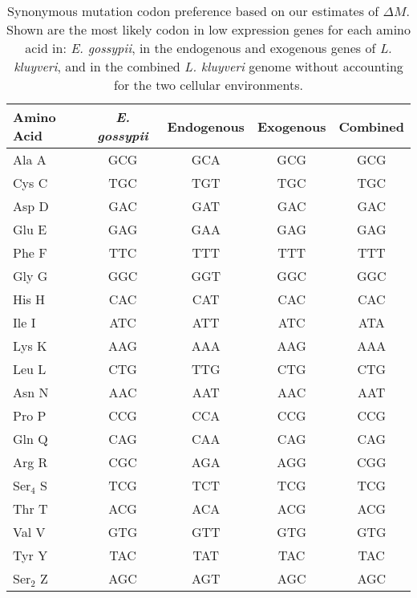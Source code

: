 \documentclass[doublespacing,linenumbers]{bmcart-modified}
\newcommand{\kluyveri}{\textit{L. kluyveri}\xspace}
\newcommand{\gossypii}{\textit{E. gossypii}\xspace}
\newcommand{\DM}{\ensuremath{{\Delta M}}\xspace}
\begin{document}
\begin{backmatter}
\begin{table}[h]
    \centering
    \caption{Synonymous mutation codon preference based on our estimates of $\DM$.
	 Shown are the most likely codon in low expression genes for each amino acid in: \gossypii, in the endogenous and exogenous genes of \kluyveri, and in the combined \kluyveri genome without accounting for the two cellular environments.}
\begin{tabular}{  l  c  c  c  c  }
\hline
	Amino Acid & \gossypii & Endogenous & Exogenous & Combined \\ \hline
	Ala A & GCG & GCA & GCG & GCG \\ 
	Cys C & TGC & TGT & TGC & TGC \\ 
	Asp D & GAC & GAT & GAC & GAC \\ 
	Glu E & GAG & GAA & GAG & GAG \\ 
	Phe F & TTC & TTT & TTT & TTT \\ 
	Gly G & GGC & GGT & GGC & GGC \\ 
	His H & CAC & CAT & CAC & CAC \\ 
	Ile I & ATC & ATT & ATC & ATA \\ 
	Lys K & AAG & AAA & AAG & AAA \\ 
	Leu L & CTG & TTG & CTG & CTG \\ 
	Asn N & AAC & AAT & AAC & AAT \\ 
	Pro P & CCG & CCA & CCG & CCG \\ 
	Gln Q & CAG & CAA & CAG & CAG \\ 
	Arg R & CGC & AGA & AGG & CGG \\ 
	Ser$_4$ S & TCG & TCT & TCG & TCG \\
	Thr T & ACG & ACA & ACG & ACG \\ 
	Val V & GTG & GTT & GTG & GTG \\ 
	Tyr Y & TAC & TAT & TAC & TAC \\ 
	Ser$_2$ Z & AGC & AGT & AGC & AGC \\ \hline
\end{tabular}
    \label{tab:codon_pref_dm}
\end{table}



\end{backmatter}
\end{document}
